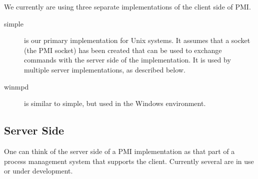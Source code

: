 \documentclass[11pt]{article}
\begin{document}
We currently are using three separate implementations of the client side of PMI.
\begin{description}
\item[simple] is our primary implementation for Unix systems.  It
  assumes that a socket (the PMI socket) has been created that can be
  used to exchange commands with the server side of the implementation.
  It is used by multiple server implementations, as described below.
\item[winmpd] is similar to simple, but used in the Windows environment.
\end{description}


\subsection{Server Side}
\label{sec:server-side}

One can think of the server side of a PMI implementation as that part of
a process management system that supports the client.  Currently several
are in use or under development.
\end{document}
